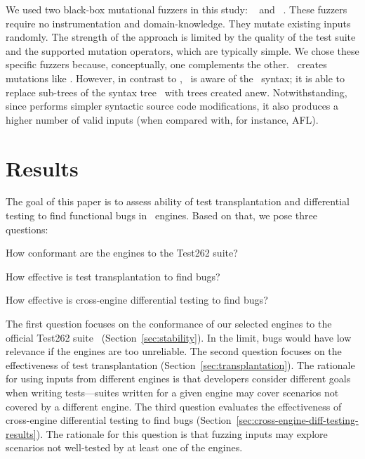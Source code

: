 \documentclass[smallextended]{svjour3}
\begin{document}
We used two black-box mutational fuzzers in this
study: \radamsa~\cite{radamsa} and \quickfuzz~\cite{quickfuzz}. These
fuzzers require no instrumentation and domain-knowledge. They mutate
existing inputs randomly. The strength of the approach is
limited by the quality of the test suite and the supported mutation
operators, which are typically simple. We chose these specific fuzzers
because, conceptually, one complements the other. \quickfuzz\ creates
mutations like \radamsa. However, in contrast to \radamsa, \quickfuzz\ is aware
of the \js\ syntax; it is able to replace sub-trees of the syntax
tree~\cite{grieco2016quickfuzz} with trees created anew. Notwithstanding,
since \radamsa performs simpler syntactic source code modifications,
it also produces a higher number of valid inputs (when compared with,
for instance, AFL).

\section{Results}
\label{sec:results}

The goal of this paper is to assess ability of
test transplantation and differential testing
to find functional bugs
in \javascript\ engines. Based on that, we pose three questions:
\begin{description}[leftmargin=.5in]
\item[RQ1.] How conformant are the engines to the Test262 suite?
\item[RQ2.] How effective is test transplantation to find bugs?
\item[RQ3.] How effective is cross-engine differential testing to find bugs?
\end{description}

The first question focuses on the conformance of our selected engines
to the official Test262 suite~\cite{ecma262-conformance-suite}
(Section~\ref{sec:stability}). In the limit, bugs would have low
relevance if the engines are too unreliable. The second question
focuses on the effectiveness of test transplantation
(Section~\ref{sec:transplantation}). The rationale for using inputs
from different engines is that developers consider different goals
when writing tests---suites written for a given engine may cover
scenarios not covered by a different engine. The third question
evaluates the effectiveness of cross-engine differential testing to
find bugs (Section~\ref{sec:cross-engine-diff-testing-results}). The
rationale for this question is that fuzzing inputs may explore
scenarios not well-tested by at least one of the engines.
\end{document}
